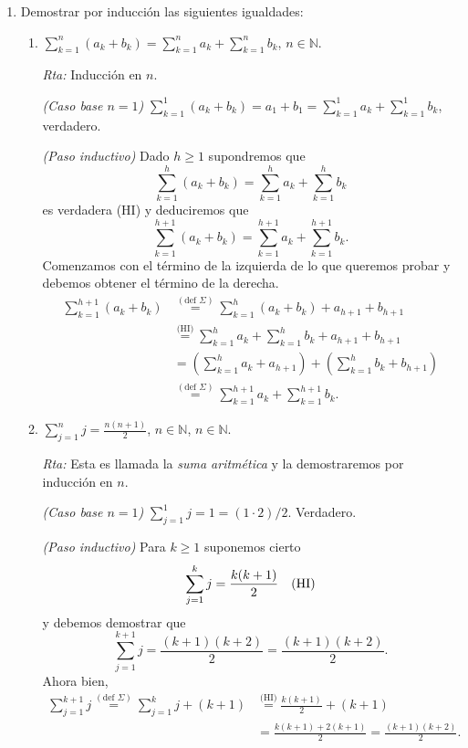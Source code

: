 \documentclass[a4paper,12pt,twoside,spanish,reqno]{amsbook}
\numberwithin{equation}{section}
\newcommand{\rta}{\noindent\textit{Rta: }}
\begin{document}
\begin{enumerate}
        
        \item\label{ej-induccion} Demostrar por inducción  las siguientes igualdades:
        \begin{enumerate}
            \item  $\displaystyle{ \sum_{k=1}^n (a_k + b_k) = \sum_{k=1}^n a_k + \sum_{k=1}^n b_k}$, $n\in \mathbb N$.
            
            \rta Inducción en $n$.
            
            \textit{(Caso base $n=1$) }  $\sum_{k=1}^1 (a_k + b_k) = a_1+b_1 = \sum_{k=1}^1 a_k + \sum_{k=1}^1 b_k$, verdadero.
            
            \textit{(Paso inductivo) } Dado $h \ge 1$ supondremos  que 
            $$\sum_{k=1}^h (a_k + b_k) = \sum_{k=1}^h a_k + \sum_{k=1}^h b_k$$ es verdadera (HI) y deduciremos que $$\sum_{k=1}^{h+1} (a_k + b_k) = \sum_{k=1}^{h+1} a_k + \sum_{k=1}^{h+1} b_k.$$
            Comenzamos con el término de la izquierda de lo que queremos probar  y debemos obtener el término de la derecha. 
            \begin{align*}
                \sum_{k=1}^{h+1} (a_k + b_k) &\overset{(\text{def } \Sigma)}{=}  \sum_{k=1}^h (a_k + b_k) + a_{h+1} + b_{h+1}\\ &\overset{\text{(HI)}}{=} \sum_{k=1}^h a_k + \sum_{k=1}^h b_k + a_{h+1} + b_{h+1}
                \\&= ( \sum_{k=1}^h a_k+a_{h+1} ) + ( \sum_{k=1}^h b_k + b_{h+1}) \\&\overset{(\text{def } \Sigma)}{=} \sum_{k=1}^{h+1} a_k + \sum_{k=1}^{h+1} b_k.
            \end{align*}
            
            
            \item\label{ej-serie-aritmetica}  $\displaystyle{ \sum_{j=1}^n j = \frac{n(n+1)}{2}}$, $n\in \mathbb N$, $n\in \mathbb N$.
            
            \rta Esta es llamada la \textit{suma aritmética} y la demostraremos por inducción en $n$.
            
            \textit{(Caso base $n=1$) } $ \sum_{j=1}^1 j = 1 = (1 \cdot 2)/2$. Verdadero. 
            
            \textit{(Paso inductivo) } Para $k \ge 1$ suponemos cierto $$\sum_{j=1}^k j = \frac{k(k+1)}{2} \text{\quad (HI)}$$  y  debemos demostrar  que $$\sum_{j=1}^{k+1} j = \frac{(k+1)(k+2)}{2} = \frac{(k+1)(k+2)}{2}.$$ Ahora bien,
            \begin{align*}
                \sum_{j=1}^{k+1} j \overset{(\text{def } \Sigma)}{=} \sum_{j=1}^k j + (k+1)&  \overset{\text{(HI)}}{=} \frac{k(k+1)}{2} + (k+1) \\&= \frac{k(k+1) +2(k+1)}{2} = \frac{(k+1)(k +2)}{2}. 
            \end{align*}
            

\end{enumerate}
\end{enumerate}
\end{document}
